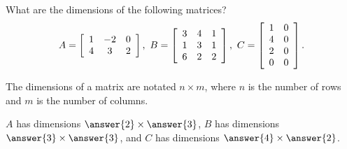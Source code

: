\documentclass{ximera}
\author{Zack Reed}
\begin{document}
\begin{problem}
  What are the dimensions of the following matrices?
  \begin{equation*}
    A = \startmat{ccc}
      1 & -2 & 0 \\
      4 & 3 & 2
    \stopmat,
    \quad
    B = \startmat{ccc}
      3 & 4 & 1 \\
      1 & 3 & 1 \\
      6 & 2 & 2
    \stopmat,
    \quad
    C = \startmat{cc}
      1 & 0 \\
      4 & 0 \\
      2 & 0 \\
      0 & 0
    \stopmat.
  \end{equation*}

  \begin{hint}
      The dimensions of a matrix are notated $n \times m$, where $n$ is the number of rows and $m$ is the number of columns.
  \end{hint}
  
  $A$ has dimensions $\answer{2}\times \answer{3}$, $B$ has dimensions $\answer{3}\times \answer{3}$, and $C$ has dimensions $\answer{4}\times \answer{2}$.
  
\end{problem}
\end{document}

